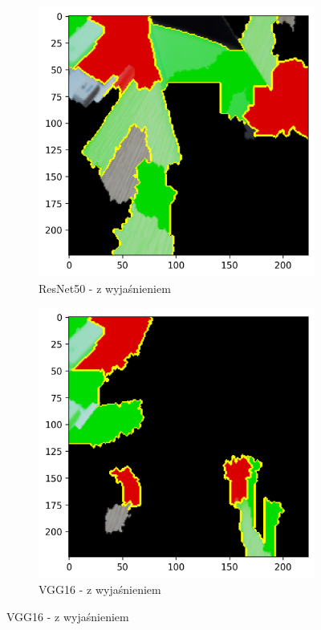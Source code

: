 \documentclass[12pt,a4paper]{article}
\begin{document}
\begin{figure}[H]
  \centering
  \begin{subfigure}{0.45\textwidth}
    \centering
    \includegraphics[width=\textwidth]{../out/ResNet50-hidden-explained.png}
    \caption{ResNet50 - z wyjaśnieniem}
  \end{subfigure}
  \begin{subfigure}{0.45\textwidth}
    \centering
    \includegraphics[width=\textwidth]{../out/VGG16-hidden-explained.png}
    \caption{VGG16 - z wyjaśnieniem}
  \end{subfigure}
\end{figure}
\end{document}
